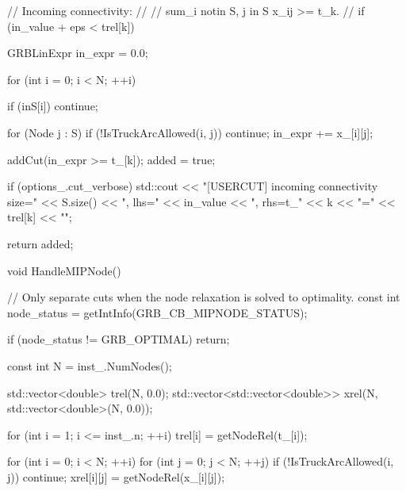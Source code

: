 {{{{                // Incoming connectivity:
                //
                //     sum_{i notin S, j in S} x_ij >= t_k.
                //
                if (in_value + eps < trel[k])
                {
                    GRBLinExpr in_expr = 0.0;

                    for (int i = 0; i < N; ++i)
                    {
                        if (inS[i])
                            continue;

                        for (Node j : S)
                        {
                            if (!IsTruckArcAllowed(i, j))
                                continue;
                            in_expr += x_[i][j];
                        }
                    }

                    addCut(in_expr >= t_[k]);
                    added = true;

                    if (options_.cut_verbose)
                    {
                        std::cout << "[USERCUT] incoming connectivity size="
                                  << S.size()
                                  << ", lhs=" << in_value
                                  << ", rhs=t_" << k
                                  << "=" << trel[k]
                                  << "\n";
                    }
                }

                return added;
            }

            void HandleMIPNode()
            {
                // Only separate cuts when the node relaxation is solved to optimality.
                const int node_status = getIntInfo(GRB_CB_MIPNODE_STATUS);

                if (node_status != GRB_OPTIMAL)
                {
                    return;
                }

                const int N = inst_.NumNodes();

                std::vector<double> trel(N, 0.0);
                std::vector<std::vector<double>> xrel(N, std::vector<double>(N, 0.0));

                for (int i = 1; i <= inst_.n; ++i)
                {
                    trel[i] = getNodeRel(t_[i]);
                }

                for (int i = 0; i < N; ++i)
                {
                    for (int j = 0; j < N; ++j)
                    {
                        if (!IsTruckArcAllowed(i, j))
                            continue;
                        xrel[i][j] = getNodeRel(x_[i][j]);
                    }
                }

}}}}
